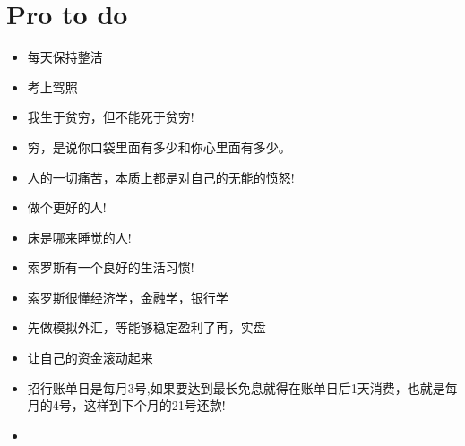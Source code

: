 \section{Pro to do}

\begin{itemize}
\item 每天保持整洁
\item 考上驾照
\item 我生于贫穷，但不能死于贫穷!
\item 穷，是说你口袋里面有多少和你心里面有多少。
\item 人的一切痛苦，本质上都是对自己的无能的愤怒!
\item 做个更好的人!
\item 床是哪来睡觉的人!

\item 索罗斯有一个良好的生活习惯!
\item 索罗斯很懂经济学，金融学，银行学


\item 先做模拟外汇，等能够稳定盈利了再，实盘

\item 让自己的资金滚动起来

\item 招行账单日是每月3号,如果要达到最长免息就得在账单日后1天消费，也就是每月的4号，这样到下个月的21号还款!
\item  

\end{itemize}